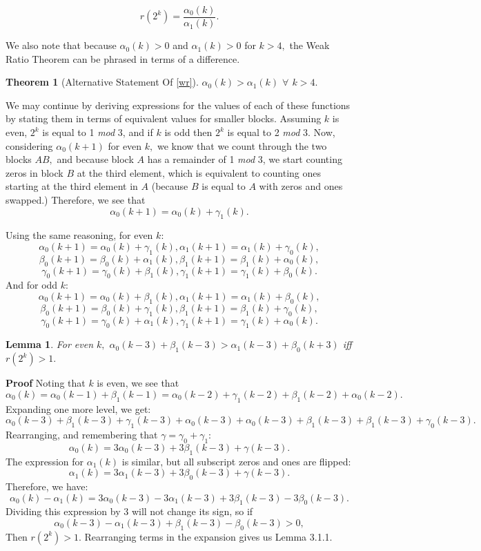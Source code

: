 \documentclass{article}
\newtheorem{theorem}{Theorem}[section]
\newtheorem{lemma}{Lemma}[section]
\begin{document}
$$r(2^k) = \frac{\alpha_0(k)}{\alpha_1(k)}.$$

We also note that because $\alpha_0(k) > 0$ and $\alpha_1(k) > 0$ for $k > 4,$ the Weak Ratio Theorem can be phrased in terms of a difference.

\begin{theorem}[Alternative Statement Of \ref{wr}]
$\alpha_0(k) > \alpha_1(k)$ $\forall$ $k > 4.$
\end{theorem}

We may continue by deriving expressions for the values of each of these functions by stating them in terms of equivalent values for smaller blocks. Assuming $k$ is even, $2^k$ is equal to 1 \emph{mod} 3, and if $k$ is odd then $2^k$ is equal to 2 \emph{mod} 3. Now, considering $\alpha_0(k+1)$ for even $k,$ we know that we count through the two blocks $AB,$ and because block $A$ has a remainder of 1 \emph{mod} 3, we start counting zeros in block $B$ at the third element, which is equivalent to counting ones starting at the third element in $A$ (because $B$ is equal to $A$ with zeros and ones swapped.) Therefore, we see that
$$\alpha_0(k+1) = \alpha_0(k) + \gamma_1(k).$$

Using the same reasoning, for even $k:$
$$\alpha_0(k+1) = \alpha_0(k) + \gamma_1(k), \alpha_1(k+1) = \alpha_1(k) + \gamma_0(k),$$
$$\beta_0(k+1) = \beta_0(k) + \alpha_1(k), \beta_1(k+1) = \beta_1(k) + \alpha_0(k),$$
$$\gamma_0(k+1) = \gamma_0(k) + \beta_1(k), \gamma_1(k+1) = \gamma_1(k) + \beta_0(k).$$
And for odd $k:$
$$\alpha_0(k+1) = \alpha_0(k) + \beta_1(k), \alpha_1(k+1) = \alpha_1(k) + \beta_0(k),$$
$$\beta_0(k+1) = \beta_0(k) + \gamma_1(k), \beta_1(k+1) = \beta_1(k) + \gamma_0(k),$$
$$\gamma_0(k+1) = \gamma_0(k) + \alpha_1(k), \gamma_1(k+1) = \gamma_1(k) + \alpha_0(k).$$

\begin{lemma}
\label{even1}
For even $k,$ $\alpha_0(k-3) + \beta_1(k-3) > \alpha_1(k-3) + \beta_0(k+3)$ \emph{iff} $r(2^k) > 1.$
\end{lemma}

\textbf{Proof} Noting that $k$ is even, we see that
$$\alpha_0(k) = \alpha_0(k-1) + \beta_1(k-1) = \alpha_0(k-2) + \gamma_1(k-2) + \beta_1(k-2) + \alpha_0(k-2).$$
Expanding one more level, we get:
$$\alpha_0(k-3) + \beta_1(k-3) + \gamma_1(k-3) + \alpha_0(k-3) + \alpha_0(k-3) + \beta_1(k-3) + \beta_1(k-3) + \gamma_0(k-3).$$
Rearranging, and remembering that $\gamma = \gamma_0 + \gamma_1:$
$$\alpha_0(k) = 3 \alpha_0(k-3) + 3 \beta_1(k-3) + \gamma(k-3).$$
The expression for $\alpha_1(k)$ is similar, but all subscript zeros and ones are flipped:
$$\alpha_1(k) = 3 \alpha_1(k-3) + 3 \beta_0(k-3) + \gamma(k-3).$$
Therefore, we have:
$$ \alpha_0(k) - \alpha_1(k) = 3 \alpha_0(k-3) - 3 \alpha_1(k-3) + 3 \beta_1(k-3) - 3 \beta_0(k-3).$$
Dividing this expression by $3$ will not change its sign, so if
$$\alpha_0(k-3) - \alpha_1(k-3) + \beta_1(k-3) - \beta_0(k-3) > 0,$$
Then $r(2^k) > 1.$ Rearranging terms in the expansion gives us Lemma 3.1.1.
\end{document}
